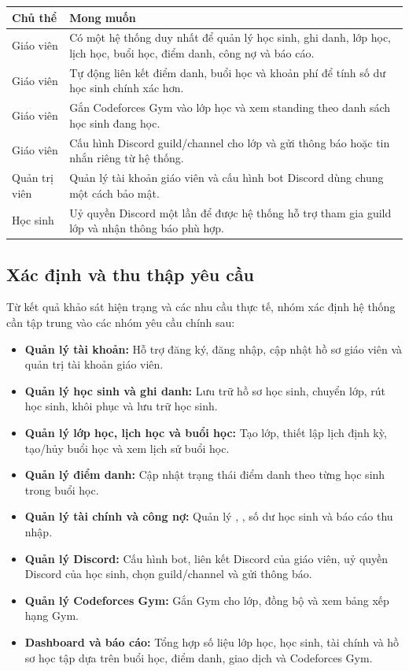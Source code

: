 \documentclass[12pt,a4paper]{article}
\newcommand{\tablesetup}{\scriptsize\setlength{\tabcolsep}{2pt}\renewcommand{\arraystretch}{1.2}}
\newcommand{\code}[1]{{\ttfamily\seqsplit{#1}}}
\begin{document}
\begin{table}[!htbp]
\centering
\tablesetup
\begin{tabularx}{\textwidth}{|L{3cm}|Y|}
\hline
\textbf{Chủ thể} & \textbf{Mong muốn} \\
\hline
Giáo viên & Có một hệ thống duy nhất để quản lý học sinh, ghi danh, lớp học, lịch học, buổi học, điểm danh, công nợ và báo cáo. \\
\hline
Giáo viên & Tự động liên kết điểm danh, buổi học và khoản phí để tính số dư học sinh chính xác hơn. \\
\hline
Giáo viên & Gắn Codeforces Gym vào lớp học và xem standing theo danh sách học sinh đang học. \\
\hline
Giáo viên & Cấu hình Discord guild/channel cho lớp và gửi thông báo hoặc tin nhắn riêng từ hệ thống. \\
\hline
Quản trị viên & Quản lý tài khoản giáo viên và cấu hình bot Discord dùng chung một cách bảo mật. \\
\hline
Học sinh & Uỷ quyền Discord một lần để được hệ thống hỗ trợ tham gia guild lớp và nhận thông báo phù hợp. \\
\hline
\end{tabularx}
\end{table}

\subsection{Xác định và thu thập yêu cầu}

Từ kết quả khảo sát hiện trạng và các nhu cầu thực tế, nhóm xác định hệ thống
cần tập trung vào các nhóm yêu cầu chính sau:

\begin{itemize}[leftmargin=*]
\item \textbf{Quản lý tài khoản:} Hỗ trợ đăng ký, đăng nhập, cập nhật hồ sơ giáo viên và quản trị tài khoản giáo viên.
\item \textbf{Quản lý học sinh và ghi danh:} Lưu trữ hồ sơ học sinh, chuyển lớp, rút học sinh, khôi phục và lưu trữ học sinh.
\item \textbf{Quản lý lớp học, lịch học và buổi học:} Tạo lớp, thiết lập lịch định kỳ, tạo/hủy buổi học và xem lịch sử buổi học.
\item \textbf{Quản lý điểm danh:} Cập nhật trạng thái điểm danh theo từng học sinh trong buổi học.
\item \textbf{Quản lý tài chính và công nợ:} Quản lý \code{FeeRecord}, \code{Transaction}, số dư học sinh và báo cáo thu nhập.
\item \textbf{Quản lý Discord:} Cấu hình bot, liên kết Discord của giáo viên, uỷ quyền Discord của học sinh, chọn guild/channel và gửi thông báo.
\item \textbf{Quản lý Codeforces Gym:} Gắn Gym cho lớp, đồng bộ \code{GymProblem} và xem bảng xếp hạng Gym.
\item \textbf{Dashboard và báo cáo:} Tổng hợp số liệu lớp học, học sinh, tài chính và hồ sơ học tập dựa trên buổi học, điểm danh, giao dịch và Codeforces Gym.
\end{itemize}
\end{document}
